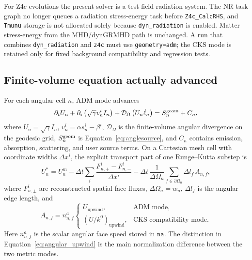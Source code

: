 \documentclass[11pt]{article}
\newcommand{\code}[1]{\texttt{#1}}
\begin{document}
For Z4c evolutions the present solver is a test-field radiation system.  The
NR task graph no longer queues a radiation stress-energy task before
\code{Z4c\_CalcRHS}, and \code{Tmunu} storage is not allocated solely because
\code{dyn\_radiation} is enabled.  Matter stress-energy from the MHD/dynGRMHD
path is unchanged.  A run that combines \code{dyn\_radiation} and \code{z4c}
must use \code{geometry=adm}; the CKS mode is retained only for fixed
background compatibility and regression tests.

\subsection{Finite-volume equation actually advanced}

For each angular cell \(n\), ADM mode advances
\begin{equation}
  \partial_t U_n
  +\partial_i\left(\sqrt{\gamma}v_n^i I_n\right)
  +\mathcal{D}_\Omega\left(U_n\dot\ell_n\right)
  =
  S^{\rm geom}_n+C_n ,
  \label{eq:adm_angle_fv}
\end{equation}
where \(U_n=\sqrt{\gamma}I_n\), \(v_n^i=\alpha s_n^i-\beta^i\),
\(\mathcal{D}_\Omega\) is the finite-volume angular divergence on the
geodesic grid, \(S^{\rm geom}_n\) is Equation~\eqref{eq:anglesource}, and
\(C_n\) contains emission, absorption, scattering, and user source terms.  On
a Cartesian mesh cell with coordinate widths \(\Delta x^i\), the explicit
transport part of one Runge--Kutta substep is
\begin{equation}
  U_n^{*}
  =
  U_n^m
  -\Delta t
  \sum_i
  \frac{F^i_{n,+}-F^i_{n,-}}{\Delta x^i}
  -\Delta t\,
  \frac{1}{\Delta\Omega_n}
  \sum_{f\in\partial\Omega_n}
     \Delta l_f\, A_{n,f},
  \label{eq:discrete_update}
\end{equation}
where \(F^i_{n,\pm}\) are reconstructed spatial face fluxes,
\(\Delta\Omega_n=w_n\), \(\Delta l_f\) is the angular edge length, and
\begin{equation}
  A_{n,f} =
  n^a_{n,f}
  \begin{cases}
    U_{\mathrm{upwind}}, & \text{ADM mode},\\
    (U/k^0)_{\mathrm{upwind}}, & \text{CKS compatibility mode}.
  \end{cases}
  \label{eq:angular_upwind}
\end{equation}
Here \(n^a_{n,f}\) is the scalar angular face speed stored in \(\code{na}\).
The distinction in Equation~\eqref{eq:angular_upwind} is the main
normalization difference between the two metric modes.
\end{document}
